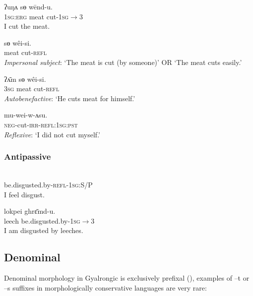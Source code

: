 \documentclass[oldfontcommands,oneside,a4paper,11pt]{article}
\newcommand{\ipa}[1]{{\phon \mbox{#1}}} %
\begin{document}
\begin{exe}
\ex \label{ex:wendu} 
\gll 
\ipa{ʔuŋʌ}  	\ipa{sɵ}  	\ipa{wēnd-u.}  \\
\textsc{1sg:erg} meat cut-\textsc{1sg$\rightarrow$3} \\
\glt I cut the meat.
\end{exe}

\begin{exe}
\ex \label{ex:weisi} 
\gll 
 \ipa{sɵ}  	\ipa{wêi-si.}  \\
 meat cut-\textsc{refl} \\
\glt \textit{Impersonal subject}: `The meat is cut (by someone)' OR `The meat cuts easily.'
\end{exe}

\begin{exe}
\ex \label{ex:weisi2} 
\gll 
 \ipa{ʔʌ̄m} \ipa{sɵ}  	\ipa{wêi-si.}  \\
\textsc{3sg} meat cut-\textsc{refl} \\
\glt \textit{Autobenefactive}: `He cuts meat for himself.'
\end{exe}
 
\begin{exe}
\ex \label{ex:weiwasu} 
\gll 
	\ipa{mu-wei-w-ʌsu.}  \\
\textsc{neg}-cut-\textsc{irr}-\textsc{refl:1sg:pst} \\
\glt \textit{Reflexive}: `I did not cut myself.'
\end{exe}  
\subsubsection{Antipassive} 
\begin{exe}
\ex \label{ex:ghryamtsi} 
\gll \ipa{gʰrɛ̄m-si-ŋʌ}\\
 be.disgusted.by-\textsc{refl-1sg:S/P} \\
\glt  I feel disgust.
\end{exe}

\begin{exe}
\ex \label{ex:ghryamt} 
\gll 
  	\ipa{lokpei}  	\ipa{ghrɛ̄md-u.}  \\
leech  be.disgusted.by-\textsc{1sg$\rightarrow$3} \\
 \glt  I am disgusted by leeches.
\end{exe}

\subsection{Denominal}
Denominal morphology in Gyalrongic is exclusively prefixal (\citealt{jacques14antipassive}), examples of \ipa{--t} or \ipa{--s} suffixes in morphologically conservative languages are very rare:
\end{document}
